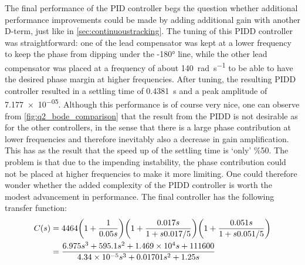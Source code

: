 The final performance of the PID controller begs the question whether additional performance improvements could be made by adding additional gain with another D-term, just like in \cref{sec:continuoustracking}. The tuning of this PIDD controller was straightforward: one of the lead compensator was kept at a lower frequency to keep the phase from dipping under the \ang{-180} line, while the other lead compensator was placed at a frequency of about \SI{140}{\radian\per\second} to be able to have the desired phase margin at higher frequencies. After tuning, the resulting PIDD controller resulted in a settling time of \SI{0.4381}{\second} and a peak amplitude of \num{7.177e-05}. Although this performance is of course very nice, one can observe from \cref{fig:q2_bode_comparison} that the result from the PIDD is not desirable as for the other controllers, in the sense that there is a large phase contribution at lower frequencies and therefore inevitably also a decrease in gain amplification. This has as the result that the speed up of the settling time is `only' \%50. The problem is that due to the impending instability, the phase contribution could not be placed at higher frequencies to make it more limiting. One could therefore wonder whether the added complexity of the PIDD controller is worth the modest advancement in performance. The final controller has the following transfer function:
$$ 
\begin{aligned}
C(s) &= 4464\qty(1 + \frac{1}{0.05s})
           \qty(1 + \frac{0.017s}{1 + s0.017/5})
           \qty(1 + \frac{0.051s}{1 + s0.051/5})\\
     &= \frac{6.975 s^3 + 595.1 s^2 + \num{1.469e04} s + 111600}{\num{4.34e-05} s^3 + 0.01701 s^2 + 1.25 s}
\end{aligned}
$$


